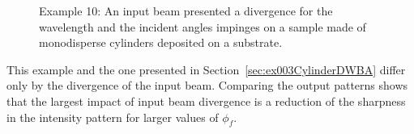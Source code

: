\begin{figure}[H]
\hfill
{}
\hfill
{}
\hfill
\caption{Example 10: An input beam presented a divergence for the wavelength and the incident angles impinges on a sample made of monodisperse cylinders deposited on a substrate.}
\label{fig:PythonEx10BeamDiv}
\end{figure}

This example and the one presented in Section~\ref{sec:ex003CylinderDWBA} differ only by the divergence of the input beam. Comparing the output patterns shows that the largest impact of input beam divergence is a reduction of the sharpness in the intensity pattern for larger values of $\phi_f$.\\




